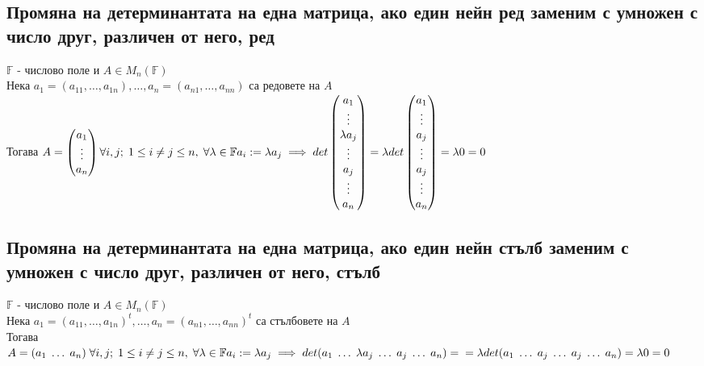 \documentclass{article}
\newcommand{\F}{\mathbb{F}}
\newcommand{\forallij}{\forall i, j; \; 1 \leq i \neq j \leq n}
\newcommand{\arows}{Нека \(a_1 = (a_{11}, \dots, a_{1n}), \dots, a_n = (a_{n1}, \dots, a_{nn})\) са редовете на \(A\)\\ Тогава }
\newcommand{\acols}{Нека \(a_1 = (a_{11}, \dots, a_{1n})^t, \dots, a_n = (a_{n1}, \dots, a_{nn})^t\) са стълбовете на \(A\)\\ Тогава }
\newcommand{\leta}{\(\F\) - числово поле и \(A \in M_n(\F)\)}
\begin{document}
    \subsection{Промяна на детерминантата на една матрица, ако един нейн ред заменим с умножен с число друг, различен от него, ред}
    \leta\\
    \arows \(A = \begin{pmatrix} a_1\\ \vdots\\ a_n \end{pmatrix} \forallij, \; \forall \lambda \in \F\\
    a_i := \lambda a_j \implies det\begin{pmatrix} a_1\\ \vdots\\ \lambda a_j\\ \vdots\\ a_j\\ \vdots\\ a_n \end{pmatrix}
    = \lambda det\begin{pmatrix} a_1\\ \vdots\\ a_j\\ \vdots\\ a_j\\ \vdots\\ a_n \end{pmatrix} = \lambda 0 = 0\)
    \subsection{Промяна на детерминантата на една матрица, ако един нейн стълб заменим с умножен с число друг, различен от него, стълб}
    \leta\\
    \acols \(A = (a_1 \; \dots \; a_n) \; \forallij, \; \forall \lambda \in \F\\
    a_i := \lambda a_j \implies det(a_1 \; \dots \; \lambda a_j \; \dots \; a_j \; \dots \; a_n) =\\
    = \lambda det(a_1 \; \dots \; a_j \; \dots \; a_j \; \dots \; a_n) = \lambda 0 = 0\)
\end{document}

